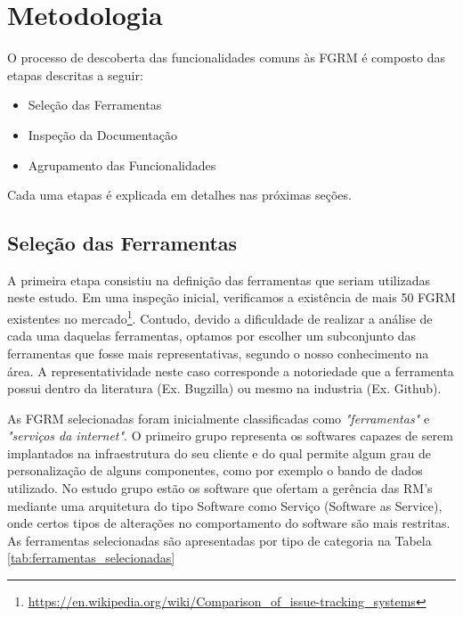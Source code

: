 \section{Metodologia}
\label{sec:metodologia}

O processo de descoberta das funcionalidades comuns às FGRM é composto das etapas descritas a
seguir:

\begin{itemize}
	\item Seleção das Ferramentas
	\item Inspeção da Documentação
	\item Agrupamento das Funcionalidades
\end{itemize}

Cada uma etapas é explicada em detalhes nas próximas seções. 

\subsection{Seleção das Ferramentas}
\label{ssub:Seleção das Ferramentas}

A primeira etapa consistiu na definição das ferramentas que seriam utilizadas neste estudo. Em uma
inspeção inicial, verificamos a existência de mais 50 FGRM existentes no
mercado\footnote{\url{https://en.wikipedia.org/wiki/Comparison_of_issue-tracking_systems}}. Contudo,
devido a dificuldade de realizar a análise de cada uma daquelas ferramentas, optamos por escolher um
subconjunto das ferramentas que fosse mais representativas, segundo o nosso conhecimento na área. A
representatividade neste caso corresponde a notoriedade que a ferramenta possui dentro da literatura
(Ex. Bugzilla) ou mesmo na industria (Ex. Github).

As FGRM selecionadas foram inicialmente classificadas como \textit{"ferramentas"} e
\textit{"serviços da internet"}. O primeiro grupo representa os softwares capazes de serem implantados
na infraestrutura do seu cliente e do qual permite algum grau de personalização de alguns
componentes, como por exemplo o bando de dados utilizado. No estudo grupo estão os software que
ofertam a gerência das RM's mediante uma arquitetura do tipo Software como Serviço (Software as
Service), onde certos tipos de alterações no comportamento do software são mais restritas. As
ferramentas selecionadas são apresentadas por tipo de categoria na Tabela
\ref{tab:ferramentas_selecionadas}

